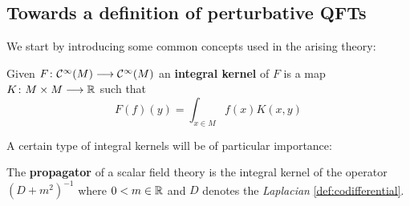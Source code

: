 \subsection{Towards a definition of perturbative QFTs}

We start by introducing some common concepts used in the arising theory:

\begin{definition}
  Given $F\colon \mathcal{C}^{\infty}(M) \longrightarrow \mathcal{C}^{\infty}(M)$ an \textbf{integral kernel} of $F$ is a map $K \colon M \times M \longrightarrow \mathbb{R}$ such that
  \begin{equation}F(f)(y) = \int_{x \in M} f(x) K(x,y)\end{equation}
\end{definition}

A certain type of integral kernels will be of particular importance:

\begin{definition}[Propagators]
  The \textbf{propagator} of a scalar field theory is the integral kernel of the operator $(D+m^2)^{-1}$ where $ 0 < m \in \mathbb{R}$ and $D$ denotes the \emph{Laplacian} \ref{def:codifferential}.
\end{definition}

